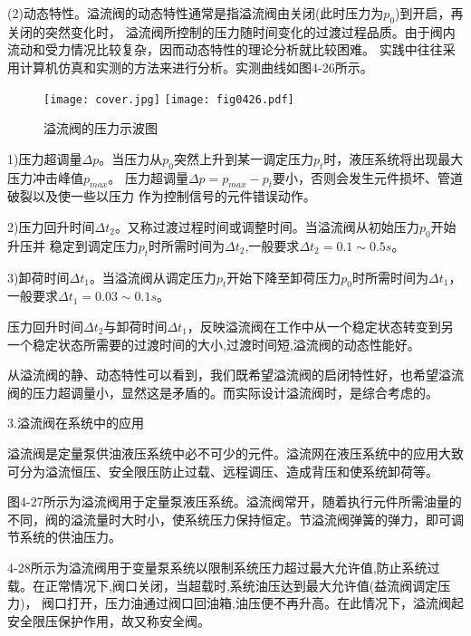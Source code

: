 (2)动态特性。溢流阀的动态特性通常是指溢流阀由关闭(此时压力为$p_0$)到开启，再关闭的突然变化时，
溢流阀所控制的压力随时间变化的过渡过程品质。由于阀内流动和受力情况比较复杂，因而动态特性的理论分析就比较困难。
实践中往往采用计算机仿真和实测的方法来进行分析。实测曲线如图4-26所示。

\begin{figure}
   \centering
    \ifOpenSource  
    \texttt{[image: cover.jpg]}
    \else
   \texttt{[image: fig0426.pdf]}
   \fi
   \caption{溢流阀的压力示波图}
   \label{fig:fig0426}
   \end{figure}


1)压力超调量$\Delta p$。当压力从$p_0$突然上升到某一调定压力$p_t$时，液压系统将出现最大压力冲击峰值$p_{max}$。
压力超调量$\Delta p=p_{max}-p_t$要小，否则会发生元件损坏、管道破裂以及使一些以压力
作为控制信号的元件错误动作。

2)压力回升时间$\Delta t_2$。又称过渡过程时间或调整时间。当溢流阀从初始压力$p_0$开始升压并
稳定到调定压力$p_t$时所需时间为$\Delta t_2$,一般要求$\Delta t_2=0.1\sim 0.5s$。

3)卸荷时间$\Delta t_1$。当溢流阀从调定压力$p_t$开始下降至卸荷压力$p_0$时所需时间为$\Delta t_1$，一般要求$\Delta t_1=0.03\sim 0.1s$。

压力回升时间$\Delta t_2$与卸荷时间$\Delta t_1$，反映溢流阀在工作中从一个稳定状态转变到另一个稳定状态所需要的过渡时间的大小,过渡时间短,溢流阀的动态性能好。

从溢流阀的静、动态特性可以看到，我们既希望溢流阀的启闭特性好，也希望溢流阀的压力超调量小，显然这是矛盾的。而实际设计溢流阀时，是综合考虑的。

3.溢流阀在系统中的应用

溢流阀是定量泵供油液压系统中必不可少的元件。溢流网在液压系统中的应用大致可分为溢流恒压、安全限压防止过载、远程调压、造成背压和使系统卸荷等。

图4-27所示为溢流阀用于定量泵液压系统。溢流阀常开，随着执行元件所需油量的不同，阀的溢流量时大时小，使系统压力保持恒定。节溢流阀弹簧的弹力，即可调节系统的供油压力。

4-28所示为溢流阀用于变量泵系统以限制系统压力超过最大允许值,防止系统过载。在正常情况下,阀口关闭，当超载时,系统油压达到最大允许值(益流阀调定压力)，
阀口打开，压力油通过阀口回油箱,油压便不再升高。在此情况下，溢流阀起安全限压保护作用，故又称安全阀。

